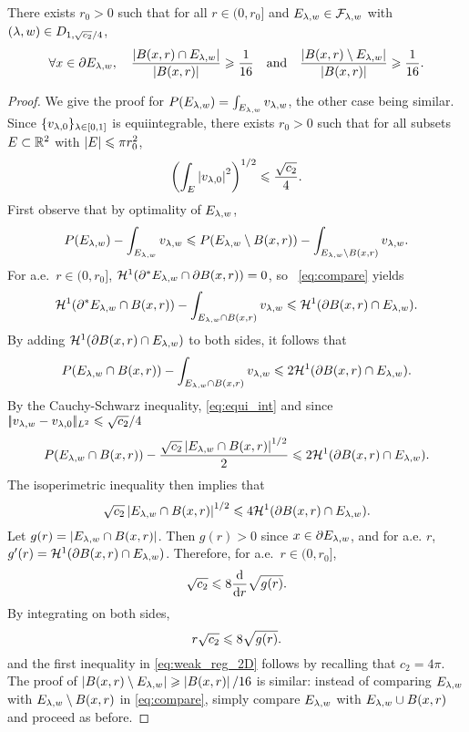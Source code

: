 \begin{prop}\label{prop:weak_reg} 
There exists $r_0>0$ such that for all $r\in (0, r_0]$ and $E_{\lambda,w}\in\mathcal{F}_{\lambda,w}$ with $(\lambda,w)\in D_{1,\sqrt{c_2}/4}$, 
\begin{equation}\label{eq:weak_reg_2D}
\forall x\in  \partial E_{\lambda,w},\quad \frac{\left| B(x,r)\cap E_{\lambda,w} \right|}{\left| B(x,r) \right|}\geqslant \frac{1}{16}\quad \text{and} \quad \frac{\left| B(x,r)\setminus E_{\lambda,w} \right|}{\left| B(x,r) \right|} \geqslant \frac{1}{16}.
\end{equation}
\end{prop}

\begin{proof}
  We give the proof for $P(E_{\lambda,w})=\int_{E_{\lambda,w}}v_{\lambda,w}$, the other case being similar.
Since $\{v_{\lambda,0} \}_{\lambda\in [0,1]}$ is equiintegrable, there exists $r_0>0$ such that for all subsets $E\subset \mathbb{R}^2$ with $\left| E \right|\leqslant \pi r_0^2$,
\begin{equation}\label{eq:equi_int}
\left(\int_{E} \left| v_{\lambda,0} \right|^2\right)^{1/2} \leqslant \frac{\sqrt{c_2}}{4}.
\end{equation}
First observe that by optimality of $E_{\lambda,w}$,
\begin{equation}\label{eq:compare}
P(E_{\lambda,w}) - \int_{E_{\lambda,w}}v_{\lambda,w} \leqslant P(E_{\lambda,w} \setminus B(x,r)) - \int_{E_{\lambda,w}\setminus B(x,r)} v_{\lambda,w}.
\end{equation}
For a.e.\ $r\in (0,r_0]$, $\mathcal{H}^1(\partial^* E_{\lambda,w} \cap \partial B(x,r))=0$, so ~\eqref{eq:compare} yields
$$
\mathcal{H}^1(\partial^* E_{\lambda,w} \cap B(x,r)) - \int_{E_{\lambda,w}\cap B(x,r)} v_{\lambda,w} \leqslant \mathcal{H}^1(\partial B(x,r) \cap E_{\lambda,w}).
$$
By adding $\mathcal{H}^1(\partial B(x,r)\cap E_{\lambda,w})$ to both sides, it follows that
$$
P(E_{\lambda,w} \cap B(x,r)) - \int_{E_{\lambda,w}\cap B(x,r)} v_{\lambda,w} \leqslant 2\mathcal{H}^1(\partial B(x,r)\cap E_{\lambda,w}).
$$
By the Cauchy-Schwarz inequality, \eqref{eq:equi_int} and since $|\!| v_{\lambda,w}- v_{\lambda,0} |\!|_{L^2}\leqslant \sqrt{c_2}/4$
$$
P(E_{\lambda,w} \cap B(x,r)) - \frac{\sqrt{c_2}\left| E_{\lambda,w} \cap B(x,r) \right|^{1/2}}{2} \leqslant 2\mathcal{H}^1(\partial B(x,r)\cap E_{\lambda,w}).
$$
The isoperimetric inequality then implies that
$$
\sqrt{c_2}\left| E_{\lambda,w}\cap B(x,r) \right|^{1/2}\leqslant 4\mathcal{H}^1(\partial B(x,r)\cap E_{\lambda,w}).
$$
Let $g(r) = \left| E_{\lambda,w}\cap B(x,r) \right|$. Then $g(r)>0$ since $x\in \partial E_{\lambda,w}$, and for a.e. $r$,
$g'(r) = \mathcal{H}^1(\partial B(x,r)\cap E_{\lambda,w})$. Therefore, for a.e.\ $r\in (0,r_0]$,
$$
\sqrt{c_2}\leqslant 8 \frac{\mathrm{d}}{\mathrm{d}r}\sqrt{g(r)}.
$$
By integrating on both sides,
$$
r\sqrt{c_2} \leqslant 8 \sqrt{g(r)}.
$$
and the first inequality in \eqref{eq:weak_reg_2D} follows by recalling that $c_2=4\pi$.
The proof of $\left| B(x,r)\setminus E_{\lambda,w} \right| \geqslant \left| B(x,r) \right|/16$ is similar: instead of comparing $E_{\lambda,w}$ with $E_{\lambda,w}\setminus B(x,r)$ in \eqref{eq:compare}, simply compare $E_{\lambda,w}$ with $E_{\lambda,w}\cup B(x,r)$ and proceed as before.

\end{proof}

